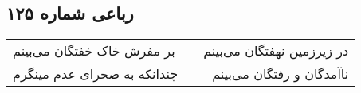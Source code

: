 \begin{center}
\section*{رباعی شماره ۱۲۵}
\label{sec:sh125}
\begin{longtable}{l p{0.5cm} r}
بر مفرش خاک خفتگان می‌بینم
&&
در زیرزمین نهفتگان می‌بینم
\\
چندانکه به صحرای عدم مینگرم
&&
ناآمدگان و رفتگان می‌بینم
\\
\end{longtable}
\end{center}
